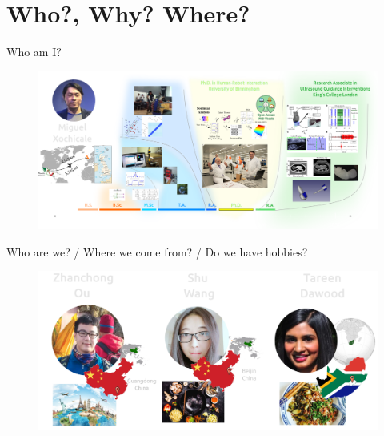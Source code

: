\section{Who?, Why? Where?}



{
\begin{frame}{Who am I?}

  \begin{figure}
  \centering
  \includegraphics[width=1.0\textwidth]{./figures/miguel-xochicale/versions/drawing-v03.png}
  \end{figure}

\end{frame}
}



{
\begin{frame}{Who are we? / Where we come from? / Do we have hobbies?}

  \begin{figure}
  \centering
  \includegraphics[width=1.0\textwidth]{./figures/who-we-are/versions/drawing-v06.png}
  \end{figure}

\end{frame}
}



